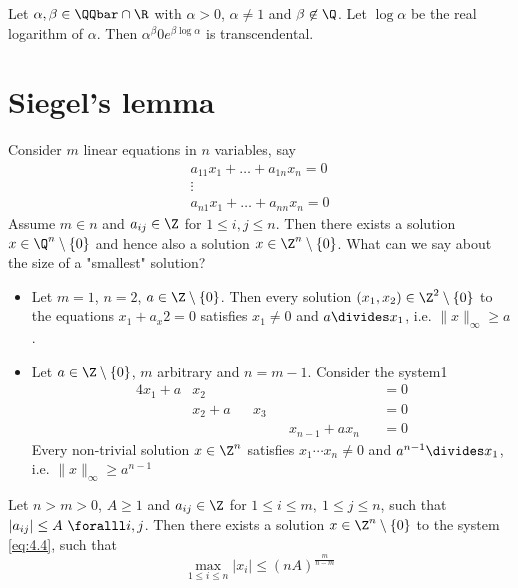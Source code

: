 \begin{thmn}
	Let \( \alpha, \beta \in \QQbar \cap \R \) with \( \alpha > 0 \), \( \alpha \neq 1 \) and \( \beta \not\in \Q \).
	Let \( \log\alpha \) be the real logarithm of \( \alpha \).
	Then \( \alpha^\beta 0 e^{\beta \log\alpha} \) is transcendental.
\end{thmn}


\section{Siegel's lemma}

Consider \( m \) linear equations in \( n \) variables, say
\begin{equation}\label{eq:4.4}
	\begin{array}{c}
		a_{11} x_1 + \dots + a_{1n}x_n = 0\\
		\vdots \\
		a_{n1}x_1 + \dots + a_{nn}x_n = 0
	\end{array}
\end{equation}
Assume \( m \in n \) and \( a_{ij} \in \Z \) for \( 1 \leq i,j \leq n \).
Then there exists a solution \( x \in \Q^n \setminus \{0\} \) and hence also a solution \( x \in \Z^n \setminus \{0\} \).
What can we say about the size of a "smallest" solution?

\begin{exmp*}
	\begin{itemize}
		\item Let \( m=1 \), \( n=2 \), \( a \in \Z \setminus \{0\} \).
			Then every solution \( (x_1,x_2) \in \Z^2 \setminus \{0\} \) to  the equations \( x_1 + a_x2 = 0 \) satisfies \( x_1 \neq 0 \) and \( a \divides x_1 \), i.e. \( \|x\|_\infty \geq a \).
		\item Let \( a \in \Z \setminus \{0\} \), \( m \) arbitrary and \( n = m-1 \).
			Consider the system1
			\begin{alignat*}{4}
				x_1 + a &x_2 && && &&= 0\\
				&x_2 + a &&x_3 && &&= 0\\
				& && &&x_{n-1} + ax_n &&= 0
			\end{alignat*}
			Every non-trivial solution \( x \in \Z^n \) satisfies \( x_1 \dotsm x_n \neq 0 \) and \( a^{n-1} \divides x_1 \), i.e. \( \|x\|_\infty \geq a^{n-1} \)
	\end{itemize}
\end{exmp*}

\begin{thm}\label{thm:4.34}
	Let \( n > m > 0 \), \( A \geq 1 \) and \( a_{ij} \in \Z \) for \( 1 \leq i \leq m,\ 1 \leq j \leq n \), such that \( |a_{ij}| \leq A \ \foralll i,j \).
	Then there exists a solution \( x \in \Z^n \setminus \{0\} \) to the system \eqref{eq:4.4}, such that
	\[ \max_{1 \leq i \leq n} |x_i| \leq (nA)^\frac{m}{n-m} \]
\end{thm}

